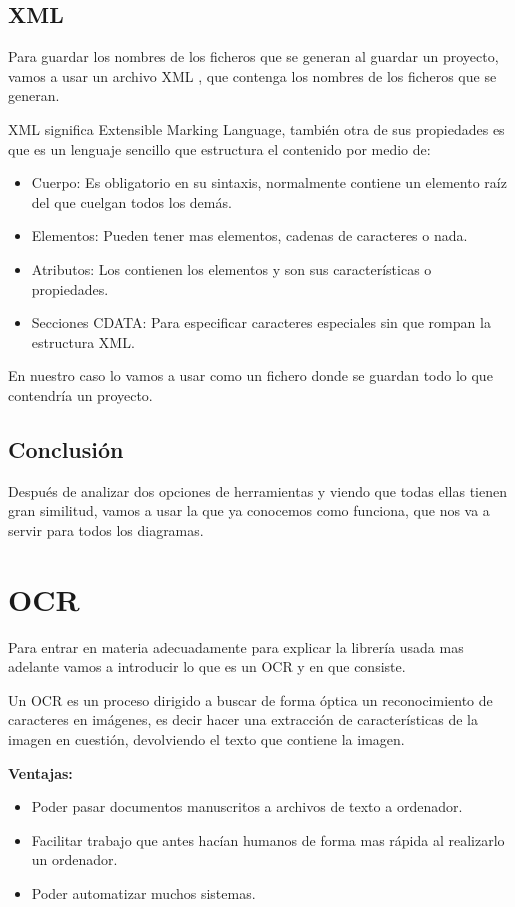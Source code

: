 \subsection{XML}
Para guardar los nombres de los ficheros que se generan al guardar un proyecto, vamos a usar un archivo XML \cite{Wiki:xml}, que contenga los nombres de los ficheros que se generan.

XML significa Extensible Marking Language, también otra de sus propiedades es que es un lenguaje sencillo que estructura el contenido por medio de:
\begin{itemize}
\item Cuerpo: Es obligatorio en su sintaxis, normalmente contiene un elemento raíz del que cuelgan todos los demás.
\item Elementos: Pueden tener mas elementos, cadenas de caracteres o nada.
\item Atributos: Los contienen los elementos y son sus características o propiedades.
\item Secciones CDATA: Para especificar caracteres especiales sin que rompan la estructura XML.
\end{itemize}
 

En nuestro caso lo vamos a usar como un fichero donde se guardan todo lo que contendría un proyecto.
\subsection{Conclusión}
Después de analizar dos opciones de herramientas y viendo que todas ellas tienen gran similitud, vamos a usar la que ya conocemos como funciona, que nos va a servir para todos los diagramas.

\section{OCR}
Para entrar en materia adecuadamente para explicar la librería usada mas adelante vamos a introducir lo que es un OCR  \cite{OCR} y en que consiste.

Un OCR es un proceso dirigido a buscar de forma óptica un reconocimiento de caracteres en imágenes, es decir hacer una extracción de características de la imagen en cuestión, devolviendo el texto que contiene la imagen.

\textbf{Ventajas:}
\begin{itemize}
\item Poder pasar documentos manuscritos a archivos de texto a ordenador.
\item Facilitar trabajo que antes hacían humanos de forma mas rápida al realizarlo un ordenador.
\item Poder automatizar muchos sistemas.
\end{itemize}


